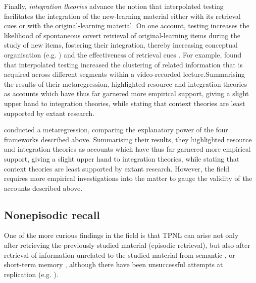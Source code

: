 \documentclass[../main.tex]{subfiles}
\begin{document}
Finally, \textit{integration theories} advance the notion that interpolated 
testing facilitates the integration of the new-learning material either with 
its retrieval cues or with the original-learning material. On one account, 
testing increases the likelihood of spontaneous covert retrieval of 
original-learning items during the study of new items, fostering their 
integration, thereby increasing conceptual organisation (e.g. 
\citealp{jingInterpolatedTestingInfluences2016}) and the effectiveness of 
retrieval cues \citep{pycWhyTestingImproves2010}. For example, 
\cite{jingInterpolatedTestingInfluences2016} found that interpolated testing 
increased the clustering of related information that is acquired across 
different segments within a video-recorded lecture.Summarising the results of 
their metaregression, \cite{chanRetrievalPotentiatesNew2018} highlighted 
resource and integration theories as accounts which have thus far garnered more 
empirical support, giving a slight upper hand to integration theories, while 
stating that context theories are least supported by extant research. 

\cite{chanRetrievalPotentiatesNew2018} conducted a metaregression, comparing 
the explanatory power of the four frameworks described above. Summarising their 
results, they highlighted resource and integration theories as accounts which 
have thus far garnered more empirical support, giving a slight upper hand to 
integration theories, while stating that context theories are least supported 
by extant research. However, the field requires more empirical investigations 
into the matter to gauge the validity of the accounts described above.

\hypertarget{nonepisodic}{%
\subsection{Nonepisodic recall}}

One of the more curious findings in the field is that TPNL can arise not 
only after retrieving the previously studied material (episodic retrieval), 
but also after retrieval of information unrelated to the studied material 
from semantic \citep{divisRetrievalSpeedsContext2014, 
pastotterRetrievalLearningFacilitates2011}, or short-term memory 
\citep{pastotterRetrievalLearningFacilitates2011}, although there have been 
unsuccessful attempts at replication (e.g. 
\citealp{weinsteinNotAllRetrieval2015}). 
\end{document}
